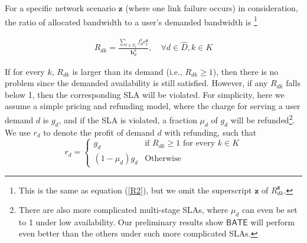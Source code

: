 \documentclass[sigconf]{acmart}
\begin{document}
For a specific network scenario $ \mathbf{z}$ (where one link failure occurs) in consideration, 
the ratio of allocated bandwidth to a user's demanded bandwidth is 
\footnote{This is the same as equation (\ref{R2}), but we omit the superscript $\mathbf{z}$ of $R_{dk}^\mathbf{z}$.}

\begin{small}
\begin{eqnarray} \label{B-return}
R_{dk}=\frac{\sum_{t\in T_k} f^{t}_{d} v_t^{\mathbf{z}}} {\mathbf{b}^k_d}, \quad \forall  d \in \hat{D},  k \in K
\end{eqnarray}
\end{small}



If for every $k$, $R_{dk}$ is larger than its demand (i.e., $R_{dk} \ge 1$), 
then there is no problem since the demanded availability is still satisfied. 
However, if any $R_{dk}$ falls below 1, then the corresponding SLA will be violated. 
For simplicity, here we assume a simple pricing and refunding model, 
where the charge for serving a user demand $d$ is $g_d$, and if the SLA is violated, 
a fraction $\mu_d$ of $g_d$ will be refunded\footnote{There are also more complicated multi-stage SLAs, 
where $\mu_d$ can even be set to 1 under low availability. Our preliminary results show $\mathsf{BATE}$ will perform even better than the others under such more complicated SLAs.}. 
We use $r_d$ to denote the profit of demand $d$ with refunding, such that
\begin{equation*}
r_d=
\begin{cases}
g_d &\text{if $R_{dk} \ge 1$ for every $k \in K$}\\
(1-\mu_{d})g_d &\text{Otherwise}
\end{cases}
\label{availability222}
\end{equation*}

\end{document}
